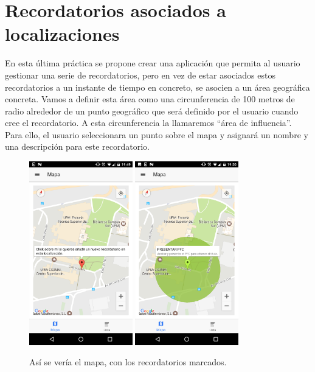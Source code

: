 \clearpage
\section{Recordatorios asociados a localizaciones} \label{sec:recordatorios}

En esta última práctica se propone crear una aplicación que permita al usuario gestionar una serie de recordatorios, pero en vez de estar asociados estos recordatorios a un instante de tiempo en concreto, se asocien a un área geográfica concreta. Vamos a definir esta área como una circunferencia de 100 metros de radio alrededor de un punto geográfico que será definido por el usuario cuando cree el recordatorio. A esta circunferencia la llamaremos ``área de influencia''. Para ello, el usuario seleccionara un punto sobre el mapa y asignará un nombre y una descripción para este recordatorio.

\begin{figure}[H]
\centering
    \centering
        \includegraphics[width=0.4\textwidth]{Figures/ch2/ReminderMap/preview_map_1}
        \includegraphics[width=0.4\textwidth]{Figures/ch2/ReminderMap/preview_map_2}
    \caption{Así se vería el mapa, con los recordatorios marcados.}
\end{figure}

